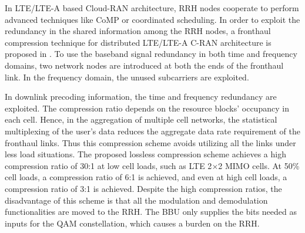 \begin{multicols}{2}
\begin{itemize}
In LTE/LTE-A based Cloud-RAN architecture, RRH nodes cooperate to perform advanced techniques like CoMP or coordinated scheduling. In order to exploit the redundancy in the shared information among the RRH nodes, a fronthaul compression technique for distributed LTE/LTE-A C-RAN architecture is proposed in \cite{art3-key65}. To use the baseband signal redundancy in both time and frequency domains, two network nodes are introduced at both the ends of the fronthaul link. In the frequency domain, the unused subcarriers are exploited.

In downlink precoding information, the time and frequency redundancy are exploited. The compression ratio depends on the resource blocks’ occupancy in each cell. Hence, in the aggregation of multiple cell networks, the statistical multiplexing of the user’s data reduces the aggregate data rate requirement of the fronthaul links. Thus this compression scheme avoids utilizing all the links under less load situations. The proposed lossless compression scheme achieves a high compression ratio of 30:1 at low cell loads, such as LTE 2$\times$2 MIMO cells. At 50\% cell loads, a compression ratio of 6:1 is achieved, and even at high cell loads, a compression ratio of 3:1 is achieved. Despite the high compression ratios, the disadvantage of this scheme is that all the modulation and demodulation functionalities are moved to the RRH. The BBU only supplies the bits needed as inputs for the QAM constellation, which causes a burden on the RRH. 


\end{itemize}

\end{multicols}







